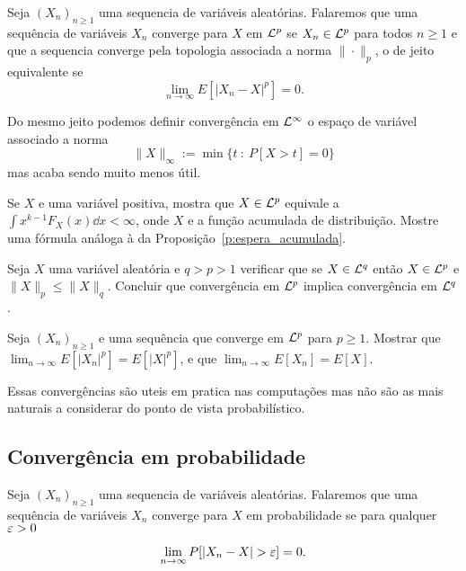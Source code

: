 \begin{definition}
Seja $(X_n)_{n\ge 1}$ uma sequencia de variáveis aleatórias.
Falaremos que uma sequência de variáveis $X_n$ converge para $X$
 em ${\mathcal L}^p$ se $X_n\in {\ensuremath{\mathcal L}}^p$ para todos $n\ge 1$ e que a sequencia converge pela topologia associada a norma $\| \cdot \|_p$, o de jeito equivalente se
 \begin{equation}
 \lim_{n\to \infty}  E[ |X_n-X|^p]=0.
 \end{equation}

\end{definition}


\begin{remark}
Do mesmo jeito podemos definir convergência em ${\mathcal L}^{\infty}$ o espaço de variável associado a norma 
$$\| X\|_\infty:= \min\{ t \ : \  P[X>t]=0 \}$$ 
mas acaba sendo muito menos útil.
\end{remark}

\begin{exercise}
Se $X$ e uma variável positiva, mostra que $X\in {\ensuremath{\mathcal L}}^p$ equivale a $\int x^{k-1}F_X(x) \dd x <\infty$, onde $X$ e a função acumulada de distribuição.
  Mostre uma fórmula análoga à da Proposição~\ref{p:espera_acumulada}.
\end{exercise}



\begin{exercise}
Seja $X$ uma variável aleatória e $q>p>1$ verificar que se $X\in {\ensuremath{\mathcal L}}^q$ então 
$X\in {\ensuremath{\mathcal L}}^p$ e $\|X\|_p\le \|X\|_q$.
Concluir que convergência em ${\mathcal L}^p$ implica convergência em ${\mathcal L}^q$.
\end{exercise}

\begin{exercise}\label{ex:l1}
Seja $(X_n)_{n\ge 1}$ e uma sequência que converge em ${\mathcal L}^p$ para $p\ge 1$. 
Mostrar que $\lim_{n\to \infty} E[|X_n|^p]= E[|X|^p]$, 
e que $\lim_{n\to \infty} E[X_n]= E[X]$.

\end{exercise}

Essas convergências são uteis em pratica nas computações mas não são as mais naturais a considerar do ponto de vista probabilístico.

\subsection{Convergência em probabilidade}

\begin{definition}
Seja $(X_n)_{n\ge 1}$ uma sequencia de variáveis aleatórias.
Falaremos que uma sequência de variáveis $X_n$ converge para $X$ em probabilidade se para qualquer $\varepsilon>0$

\begin{equation}
\lim_{n\to \infty} P[ |X_n-X|>\gep ]=0.
\end{equation}
\end{definition}


